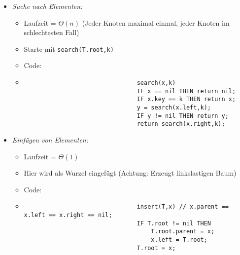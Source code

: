 \begin{itemize}
\begin{itemize}
                    \item \textit{Suche nach Elementen:}
                        \begin{itemize}
                            \item Laufzeit = $\Theta(n)$ (Jeder Knoten maximal einmal, jeder Knoten im schlechtesten Fall)
                            \item Starte mit \texttt{search(T.root,k)}
                            \item Code:
                            \item[]
                                \begin{verbatim}
                                search(x,k)
                                IF x == nil THEN return nil;
                                IF x.key == k THEN return x;
                                y = search(x.left,k);
                                IF y != nil THEN return y;
                                return search(x.right,k);
                                \end{verbatim}
                        \end{itemize}

                    \item \textit{Einfügen von Elementen:}
                        \begin{itemize}
                            \item Laufzeit = $\Theta(1)$ 
                            \item Hier wird als Wurzel eingefügt (Achtung: Erzeugt linkslastigen Baum)
                            \item Code:
                            \item[]
                                \begin{verbatim}
                                insert(T,x) // x.parent == x.left == x.right == nil;
                                IF T.root != nil THEN 
                                    T.root.parent = x;
                                    x.left = T.root;
                                T.root = x;
                                \end{verbatim}
                        \end{itemize}


\end{itemize}
\end{itemize}
